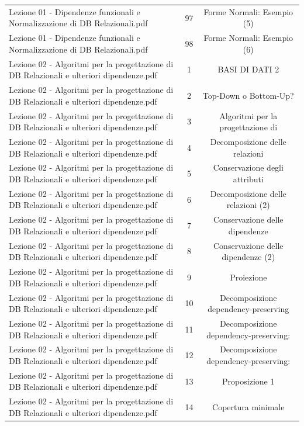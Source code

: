 \documentclass[11pt]{article}
\begin{document}
\begin{longtable}{@{}p{}cc@{}}
Lezione 01 - Dipendenze funzionali e Normalizzazione di DB Relazionali.pdf & 97 & Forme Normali: Esempio (5) \\
Lezione 01 - Dipendenze funzionali e Normalizzazione di DB Relazionali.pdf & 98 & Forme Normali: Esempio (6) \\
Lezione 02 - Algoritmi per la progettazione di DB Relazionali e ulteriori dipendenze.pdf & 1 & BASI DI DATI 2 \\
Lezione 02 - Algoritmi per la progettazione di DB Relazionali e ulteriori dipendenze.pdf & 2 & Top-Down o Bottom-Up? \\
Lezione 02 - Algoritmi per la progettazione di DB Relazionali e ulteriori dipendenze.pdf & 3 & Algoritmi per la progettazione di \\
Lezione 02 - Algoritmi per la progettazione di DB Relazionali e ulteriori dipendenze.pdf & 4 & Decomposizione delle relazioni \\
Lezione 02 - Algoritmi per la progettazione di DB Relazionali e ulteriori dipendenze.pdf & 5 & Conservazione degli attributi \\
Lezione 02 - Algoritmi per la progettazione di DB Relazionali e ulteriori dipendenze.pdf & 6 & Decomposizione delle relazioni (2) \\
Lezione 02 - Algoritmi per la progettazione di DB Relazionali e ulteriori dipendenze.pdf & 7 & Conservazione delle dipendenze \\
Lezione 02 - Algoritmi per la progettazione di DB Relazionali e ulteriori dipendenze.pdf & 8 & Conservazione delle dipendenze (2) \\
Lezione 02 - Algoritmi per la progettazione di DB Relazionali e ulteriori dipendenze.pdf & 9 & Proiezione \\
Lezione 02 - Algoritmi per la progettazione di DB Relazionali e ulteriori dipendenze.pdf & 10 & Decomposizione dependency-preserving \\
Lezione 02 - Algoritmi per la progettazione di DB Relazionali e ulteriori dipendenze.pdf & 11 & Decomposizione dependency-preserving: \\
Lezione 02 - Algoritmi per la progettazione di DB Relazionali e ulteriori dipendenze.pdf & 12 & Decomposizione dependency-preserving: \\
Lezione 02 - Algoritmi per la progettazione di DB Relazionali e ulteriori dipendenze.pdf & 13 & Proposizione 1 \\
Lezione 02 - Algoritmi per la progettazione di DB Relazionali e ulteriori dipendenze.pdf & 14 & Copertura minimale \\

\end{longtable}
\end{document}
